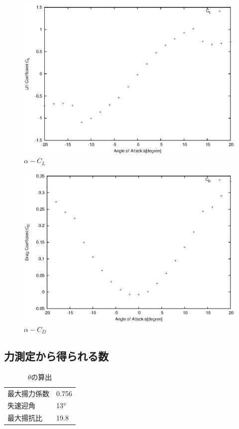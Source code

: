 \documentclass[a4j,twoside,openright,11pt]{jarticle}
\begin{document}
\begin{figure}[htbp]
\begin{center}
\includegraphics[width=12cm]{./2-CL-CD/CL-CD.eps}
\end{center}
\caption{$\alpha-C_L$}
\end{figure}

\begin{figure}[htbp]
\begin{center}
\includegraphics[width=12cm]{./2-CL-CD/CD.eps}
\end{center}
\caption{$\alpha-C_D$}
\end{figure}


\newpage
\subsection{力測定から得られる数}
\begin{table}[htb]
\begin{center}
  \caption{$\theta$の算出}
  \begin{tabular}{ll} \hline
最大揚力係数 &0.756\\
失速迎角     &13°\\
最大揚抗比   &19.8\\
\hline
  \end{tabular}
\end{center}
\end{table}
\end{document}
